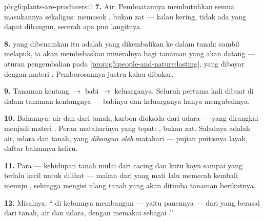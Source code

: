 \begin{solution}{pb:g6:plants-are-producers:1}
\textbf{7.} Air. Pembuatannya membutuhkan semua masukannya sekaligus:
 memasok , bukan zat --- kalau  kering, tidak ada
yang dapat dibangun, secerah apa pun langitnya.

\textbf{8.}  yang dibenamkan itu adalah  yang
dikembalikan ke dalam tanah: sambil melapuk, ia akan membebaskan
mineralnya bagi tanaman yang akan datang --- aturan pengembalian pada
\cref{prop:g5:people-and-nature:lasting}, yang dibayar dengan materi
. Pemborosannya justru kalau  dibakar.

\textbf{9.} Tanaman kentang $\rightarrow$ babi $\rightarrow$
keluarganya. Seluruh  pertama kali dibuat di dalam
 tanaman kentangnya --- babinya dan keluarganya hanya
mengubahnya.

\textbf{10.} Bahannya: air dan  dari tanah, karbon
dioksida dari udara --- yang dirangkai menjadi materi . Peran
mataharinya yang tepat: , bukan zat. Saladnya adalah air, udara
dan tanah, yang \emph{dibangun oleh}  matahari --- pujian
puitisnya layak, daftar bahannya keliru.

\textbf{11.} Para  --- kehidupan tanah mulai dari cacing
dan kutu kayu sampai  yang terlalu kecil untuk dilihat
--- makan dari  yang mati lalu memecah  kembali
menuju , sehingga mengisi ulang tanah yang akan ditimba
tanaman berikutnya.

\textbf{12.} Misalnya: `` di kebunnya membangun 
--- yaitu panennya --- dari  yang berasal dari tanah,
air dan udara, dengan memakai  sebagai .''
\end{solution}
